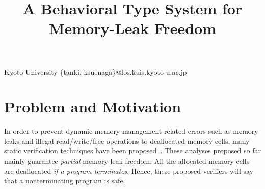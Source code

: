 \documentclass{sigplanconf}
\begin{document}
\setlength{\pdfpageheight}{\paperheight}
\setlength{\pdfpagewidth}{\paperwidth}


\title{A Behavioral Type System for Memory-Leak Freedom}

           {Kyoto University}
           {\{tanki, ksuenaga\}@fos.kuis.kyoto-u.ac.jp}


\maketitle

\newcommand\tB{\;|\;}
\newcommand\LET{\mathbf{let}\;}
\newcommand\FREE{\mathbf{free(x)}}
\newcommand\IN{\mathbf{in}\;}
\newcommand\SKIP{\mathbf{skip}}
\newcommand\NULL{\mathbf{null}}
\newcommand\IFNULL{\mathbf{ifnull}\;}
\newcommand\THEN{\mathbf{then}\;}
\newcommand\ELSE{\mathbf{else}\;}
\newcommand\Rtab{\; \; \; \;}
\newcommand\Lcc{\left(}
\newcommand\Rcc{\right)}
\newcommand\Lfc{\left\{}
\newcommand\Rfc{\right\}}
\newcommand\Lb{\left[}
\newcommand\Rb{\right]}
\newcommand\coma{,\;}
\newcommand\MALLOC{\mathbf{malloc()}}
\newcommand\Malloc{\mathbf{malloc}}
\newcommand\Free{\mathbf{free}}
\newcommand\Cirx{(x)}
\newcommand\dtb{\;\;\ \;\;\ \;\;}
\newtheorem{exmp}{Example}[section]
\newcommand\TSEQ{;\!}
\newcommand\TSKIP{\mathbf{0}}
\newcommand\OVERFLOW{\mathbf{OutOfMemory}}
\newcommand\DOM{\mathbf{Dom}}
\newcommand\FUNTYPE{\varphi}
\newcommand\bs{\backslash}
\newcommand\MEMEX{\mathbf{MemEx}}
\newtheorem{theorem}{Theorem}[section]
\newtheorem{lemma}[theorem]{Lemma}
\newtheorem{proposition}[theorem]{Proposition}
\newtheorem{corollary}[theorem]{Corollary}
\newtheorem{myDef}{Definition}
\newtheorem{remark}{Remark}[section]
\newcommand\set[1]{\{#1\}}
\newcommand\COL{\!:\!}
\newcommand\VAR{\mathbf{Var}}

\theoremstyle{definition}

\newenvironment{nospaceflalign*}
 {\setlength{\abovedisplayskip}{0pt}\setlength{\belowdisplayskip}{0pt}%
  \csname flalign*\endcsname}
 {\csname endflalign*\endcsname\ignorespacesafterend}

\section{Problem and Motivation}
In order to prevent dynamic memory-management related errors such as
memory leaks and illegal read/write/free operations to deallocated
memory cells, many static verification techniques have been
proposed~\cite{DBLP:conf/aplas/SuenagaK09,DBLP:conf/pldi/HeineL03,DBLP:conf/sigsoft/XieA05,DBLP:journals/scp/SwamyHMGJ06,DBLP:conf/sas/OrlovichR06,DBLP:conf/issta/SuiYX12}.
These analyses proposed so far mainly guarantee \emph{partial}
memory-leak freedom: All the allocated memory cells are deallocated
\emph{if a program terminates}.  Hence, these proposed verifiers will
say that a nonterminating program is safe.
\end{document}

